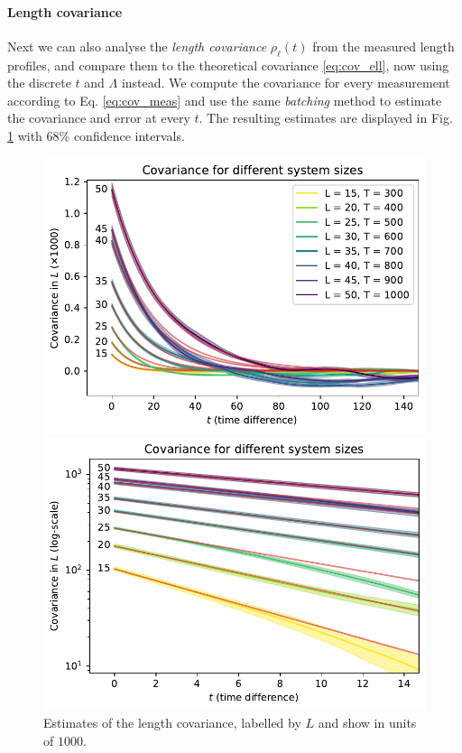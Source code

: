 \paragraph{Length covariance}
Next we can also analyse the \emph{length covariance} $\rho_\ell(t)$ from the measured length profiles, and compare them to the theoretical covariance \eqref{eq:cov_ell}, now using the discrete $t$ and $\Lambda$ instead.
We compute the covariance for every measurement according to Eq. \eqref{eq:cov_meas} and use the same \emph{batching} method to estimate the covariance and error at every $t$.
The resulting estimates are displayed in Fig. \ref{fig:cov_plot} with $68\%$ confidence intervals.
\begin{figure}[ht]
    \begin{minipage}[t]{0.49\linewidth}
        \centering
        \includegraphics[width=\linewidth]{img/cov_L.pdf}
        \caption{Estimates of the length covariance, labelled by $L$ and show in units of $1000$.}
        \label{fig:cov_plot}
    \end{minipage}
    \hfill
    \begin{minipage}[t]{0.49\linewidth}
        \centering
        \includegraphics[width=\linewidth]{img/cov_L_log.pdf}

\end{minipage}
\end{figure}
